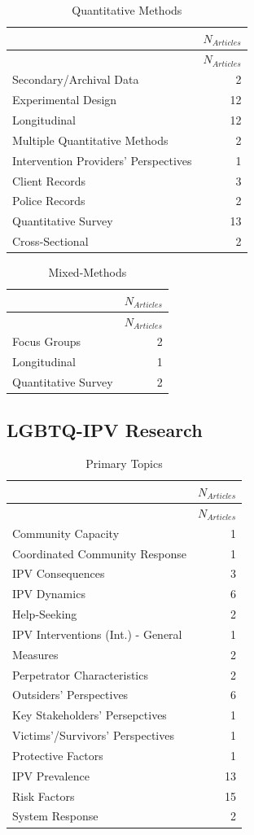 \documentclass[]{tufte-handout}
\begin{document}
\begin{longtable}[]{@{}lr@{}}
\caption{Quantitative Methods}\tabularnewline
\toprule
& \(N_{Articles}\)\tabularnewline
\midrule
\endfirsthead
\toprule
& \(N_{Articles}\)\tabularnewline
\midrule
\endhead
Secondary/Archival Data & 2\tabularnewline
Experimental Design & 12\tabularnewline
Longitudinal & 12\tabularnewline
Multiple Quantitative Methods & 2\tabularnewline
Intervention Providers' Perspectives & 1\tabularnewline
Client Records & 3\tabularnewline
Police Records & 2\tabularnewline
Quantitative Survey & 13\tabularnewline
Cross-Sectional & 2\tabularnewline
\bottomrule
\end{longtable}

\begin{longtable}[]{@{}lr@{}}
\caption{Mixed-Methods}\tabularnewline
\toprule
& \(N_{Articles}\)\tabularnewline
\midrule
\endfirsthead
\toprule
& \(N_{Articles}\)\tabularnewline
\midrule
\endhead
Focus Groups & 2\tabularnewline
Longitudinal & 1\tabularnewline
Quantitative Survey & 2\tabularnewline
\bottomrule
\end{longtable}

\newpage

\subsection{LGBTQ-IPV Research}\label{lgbtq-ipv-research}

\begin{longtable}[]{@{}lr@{}}
\caption{Primary Topics}\tabularnewline
\toprule
& \(N_{Articles}\)\tabularnewline
\midrule
\endfirsthead
\toprule
& \(N_{Articles}\)\tabularnewline
\midrule
\endhead
Community Capacity & 1\tabularnewline
Coordinated Community Response & 1\tabularnewline
IPV Consequences & 3\tabularnewline
IPV Dynamics & 6\tabularnewline
Help-Seeking & 2\tabularnewline
IPV Interventions (Int.) - General & 1\tabularnewline
Measures & 2\tabularnewline
Perpetrator Characteristics & 2\tabularnewline
Outsiders' Perspectives & 6\tabularnewline
Key Stakeholders' Persepctives & 1\tabularnewline
Victims'/Survivors' Perspectives & 1\tabularnewline
Protective Factors & 1\tabularnewline
IPV Prevalence & 13\tabularnewline
Risk Factors & 15\tabularnewline
System Response & 2\tabularnewline
\bottomrule
\end{longtable}
\end{document}
